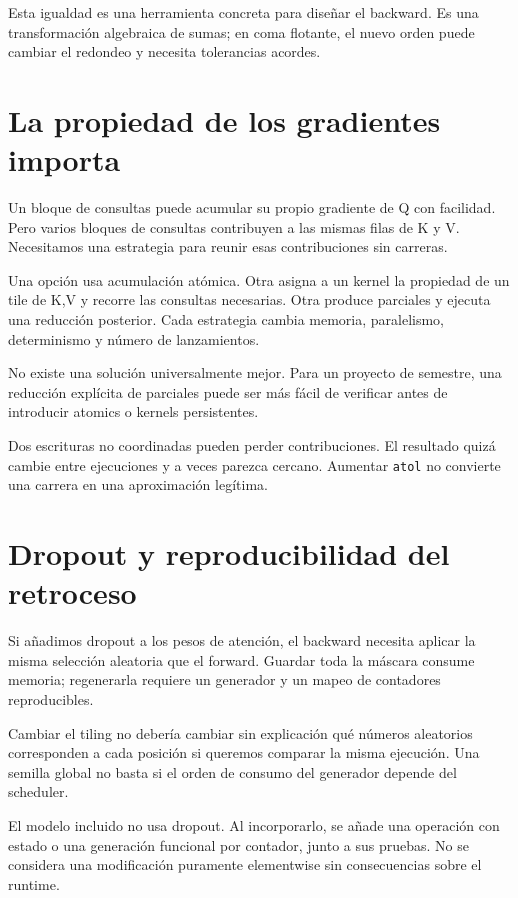 \documentclass[12pt,a4paper,oneside]{report}
\begin{document}
Esta igualdad es una herramienta concreta para diseñar el backward. Es una transformación algebraica de sumas; en coma flotante, el nuevo orden puede cambiar el redondeo y necesita tolerancias acordes.

\section{La propiedad de los gradientes importa}
Un bloque de consultas puede acumular su propio gradiente de Q con facilidad. Pero varios bloques de consultas contribuyen a las mismas filas de K y V. Necesitamos una estrategia para reunir esas contribuciones sin carreras.

Una opción usa acumulación atómica. Otra asigna a un kernel la propiedad de un tile de K,V y recorre las consultas necesarias. Otra produce parciales y ejecuta una reducción posterior. Cada estrategia cambia memoria, paralelismo, determinismo y número de lanzamientos.

No existe una solución universalmente mejor. Para un proyecto de semestre, una reducción explícita de parciales puede ser más fácil de verificar antes de introducir atomics o kernels persistentes.

\begin{cuidado}
Dos escrituras no coordinadas pueden perder contribuciones. El resultado quizá cambie entre ejecuciones y a veces parezca cercano. Aumentar \texttt{atol} no convierte una carrera en una aproximación legítima.

\end{cuidado}
\section{Dropout y reproducibilidad del retroceso}
Si añadimos dropout a los pesos de atención, el backward necesita aplicar la misma selección aleatoria que el forward. Guardar toda la máscara consume memoria; regenerarla requiere un generador y un mapeo de contadores reproducibles.

Cambiar el tiling no debería cambiar sin explicación qué números aleatorios corresponden a cada posición si queremos comparar la misma ejecución. Una semilla global no basta si el orden de consumo del generador depende del scheduler.

El modelo incluido no usa dropout. Al incorporarlo, se añade una operación con estado o una generación funcional por contador, junto a sus pruebas. No se considera una modificación puramente elementwise sin consecuencias sobre el runtime.
\end{document}
